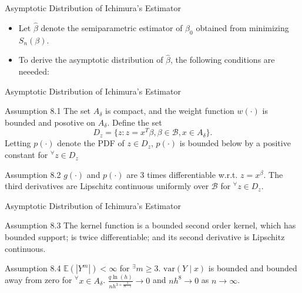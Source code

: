 \documentclass[xcolor=svgnames,dvipdfmx,cjk]{beamer}
\theoremstyle{example}
\def\var{\text{var}}
\def\E{\mathbb{E}}
\begin{document}
\begin{frame}{Asymptotic Distribution of Ichimura's Estimator}
  \begin{itemize}
    \item Let $\hat{\beta}$ denote the semiparametric estimator of $\beta_0$
          obtained from minimizing $S_n(\beta)$.
    \item To derive the asymptotic distribution of $\hat{\beta}$, the following conditions are neeeded:
  \end{itemize}
  \end{frame}
  
  
  \begin{frame}{Asymptotic Distribution of Ichimura's Estimator}
    \begin{itembox}[l]{Assumption 8.1}
      The set $A_\delta$ is compact, 
      and the weight function $w(\cdot)$ is bounded and posotive on $A_\delta$.
      Define the set 
      \[D_z = \{ z: z=x^{T}\beta, \beta \in \mathcal{B}, x \in A_\delta \}.\]
      Letting $p(\cdot)$ denote the PDF of $z \in D_z$, 
      $p(\cdot)$ is bounded below by a positive constant for $^\forall z \in D_z$
    \end{itembox}
    \begin{itembox}[l]{Assumption 8.2}
      $g(\cdot)$ and $p(\cdot)$ are 3 times differentiable w.r.t. $z=x^{\beta}$.
      The third derivatives are Lipschitz continuous uniformly over $\mathcal{B}$
      for $^{\forall} z \in D_z$. 
    \end{itembox}
  \end{frame}
  
  \begin{frame}{Asymptotic Distribution of Ichimura's Estimator}
    \begin{itembox}[l]{Assumption 8.3} 
      The kernel function is a bounded second order kernel, which has bounded support;
      is twice differentiable; 
      and its second derivative is Lipschitz continuous.
    \end{itembox}
    \begin{itembox}[l]{Assumption 8.4}
      $\E(|Y^m|) < \infty$ for $^{\exists} m \geq 3$.
      $\var(Y \mid x)$ is bounded and 
      bounded away from zero for $^{\forall} x \in A_\delta$. 
      $\frac{q \ln(h)}{nh^{3 + \frac{3}{m-1}}} \to 0$ and 
      $ nh^8 \to 0$ as $n \to \infty$.
    \end{itembox}
  \end{frame}
  
\end{document}
